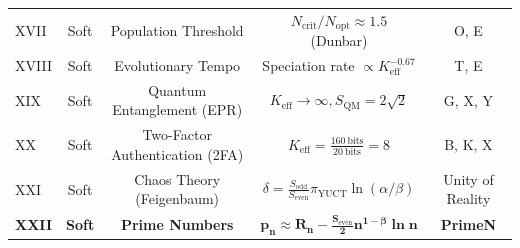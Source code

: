 \documentclass[12pt,a4paper]{article}
\begin{document}
\begin{table}[htbp]
\begin{tabular}{l c c c c}
			XVII& Soft & Population Threshold & \(N_{\mathrm{crit}}/N_{\mathrm{opt}} \approx 1.5\) (Dunbar) & O, E \\
			XVIII&Soft & Evolutionary Tempo & Speciation rate \(\propto K_{\mathrm{eff}}^{-0.67}\) & T, E \\
			XIX & Soft & Quantum Entanglement (EPR) & \(K_{\mathrm{eff}} \to \infty, S_{\mathrm{QM}} = 2\sqrt{2}\) & G, X, Y \\
			XX  & Soft & Two-Factor Authentication (2FA) & \(K_{\mathrm{eff}} = \frac{160\ \text{bits}}{20\ \text{bits}} = 8\) & B, K, X \\
			XXI & Soft & Chaos Theory (Feigenbaum) & \(\delta = \frac{S_{\mathrm{odd}}}{S_{\mathrm{even}}} \pi_{\mathrm{YUCT}} \ln(\alpha/\beta)\) & Unity of Reality \\
			\textbf{XXII} & \textbf{Soft} & \textbf{Prime Numbers} & \(\mathbf{p_n \approx R_n - \frac{S_{\mathrm{even}}}{2}n^{1-\beta}\ln n}\) & \textbf{PrimeN} \\
			\bottomrule
		\end{tabular}
	\end{table}
	
\end{document}
